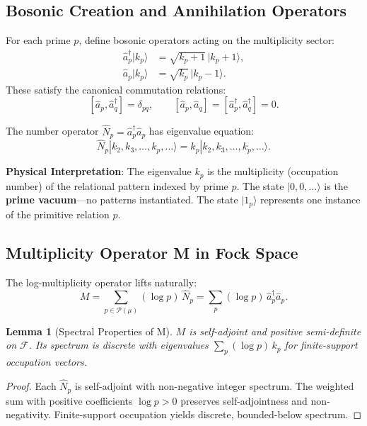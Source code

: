 \documentclass[12pt]{amsart}
\theoremstyle{plain}
\newtheorem{lemma}[theorem]{Lemma}
\begin{document}
\subsection{Bosonic Creation and Annihilation Operators}

For each prime \(p\), define bosonic operators acting on the multiplicity sector:
\begin{align}
\hat{a}_p^\dagger |k_p\rangle &= \sqrt{k_p + 1} \, |k_p + 1\rangle, \\
\hat{a}_p |k_p\rangle &= \sqrt{k_p} \, |k_p - 1\rangle.
\end{align}
These satisfy the canonical commutation relations:
\[
[\hat{a}_p, \hat{a}_q^\dagger] = \delta_{pq}, \qquad [\hat{a}_p, \hat{a}_q] = [\hat{a}_p^\dagger, \hat{a}_q^\dagger] = 0.
\]

The number operator \(\hat{N}_p = \hat{a}_p^\dagger \hat{a}_p\) has eigenvalue equation:
\[
\hat{N}_p |k_2, k_3, \ldots, k_p, \ldots\rangle = k_p |k_2, k_3, \ldots, k_p, \ldots\rangle.
\]

\textbf{Physical Interpretation}: The eigenvalue \(k_p\) is the multiplicity (occupation number) of the relational pattern indexed by prime \(p\). The state \(|0,0,\ldots\rangle\) is the \textbf{prime vacuum}---no patterns instantiated. The state \(|1_p\rangle\) represents one instance of the primitive relation \(p\).

\subsection{Multiplicity Operator M in Fock Space}

The log-multiplicity operator lifts naturally:
\[
M = \sum_{p \in \mathcal{P}(\mu)} (\log p) \, \hat{N}_p = \sum_p (\log p) \, \hat{a}_p^\dagger \hat{a}_p.
\]

\begin{lemma}[Spectral Properties of M]
\(M\) is self-adjoint and positive semi-definite on \(\mathcal{F}\). Its spectrum is discrete with eigenvalues \(\sum_p (\log p) \, k_p\) for finite-support occupation vectors.
\end{lemma}

\begin{proof}
Each \(\hat{N}_p\) is self-adjoint with non-negative integer spectrum. The weighted sum with positive coefficients \(\log p > 0\) preserves self-adjointness and non-negativity. Finite-support occupation yields discrete, bounded-below spectrum.
\end{proof}
\end{document}
